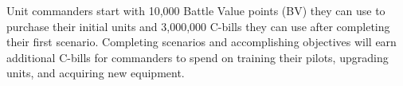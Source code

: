 Unit commanders start with 10,000 Battle Value points (BV) they can use to purchase their initial units and 3,000,000 C-bills they can use after completing their first scenario.
Completing scenarios and accomplishing objectives will earn additional C-bills for commanders to spend on training their pilots, upgrading units, and acquiring new equipment.
